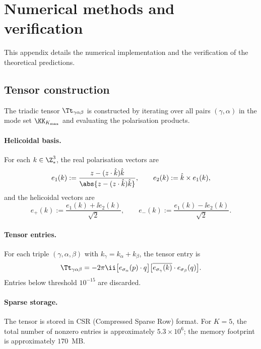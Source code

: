 \section{Numerical methods and verification}
\label{app:D}

This appendix details the numerical implementation and the 
verification of the theoretical predictions.

\subsection{Tensor construction}
\label{ssec:D-tensor}

The triadic tensor $\Tt_{\gamma\alpha\beta}$ is constructed by 
iterating over all pairs $(\gamma,\alpha)$ in the mode set 
$\KK_{K_{\max}}$ and evaluating the polarisation products.

\paragraph{Helicoidal basis.} 
For each $k\in\Z^3_\ast$, the real polarisation vectors are
\begin{equation}\label{eq:D-real-basis}
e_1(k) := \frac{z - (z\cdot\hat k)\hat k}
               {\abs{z - (z\cdot\hat k)\hat k}},
\qquad
e_2(k) := \hat k\times e_1(k),
\end{equation}
and the helicoidal vectors are
\begin{equation}\label{eq:D-helical-basis}
e_+(k) := \frac{e_1(k)+\ii e_2(k)}{\sqrt 2},
\qquad
e_-(k) := \frac{e_1(k)-\ii e_2(k)}{\sqrt 2}.
\end{equation}

\paragraph{Tensor entries.}
For each triple $(\gamma,\alpha,\beta)$ with $k_\gamma = k_\alpha + 
k_\beta$, the tensor entry is
\begin{equation}\label{eq:D-tensor-entry}
\Tt_{\gamma\alpha\beta} = -2\pi\ii\bigl[e_{\sigma_\alpha}(p)\cdot 
q\bigr]\bigl[\overline{e_{\sigma_\gamma}(k)}\cdot 
e_{\sigma_\beta}(q)\bigr].
\end{equation}
Entries below threshold $10^{-15}$ are discarded.

\paragraph{Sparse storage.}
The tensor is stored in CSR (Compressed Sparse Row) format. For 
$K=5$, the total number of nonzero entries is approximately 
$5.3\times 10^6$; the memory footprint is approximately $170$~MB.

